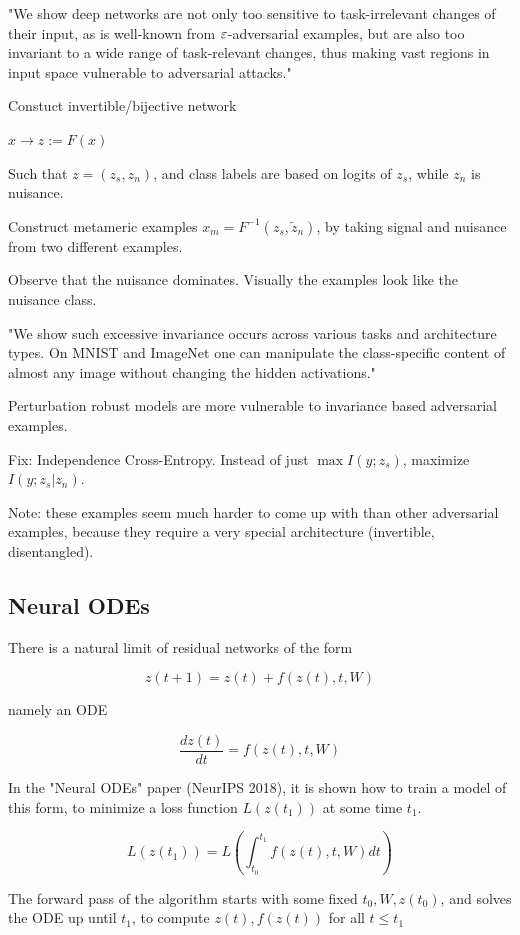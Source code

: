 \documentclass[english]{article}
\begin{document}
"We show
deep networks are not only too sensitive to task-irrelevant changes of their input,
as is well-known from $\varepsilon$-adversarial examples, but are also too invariant to a wide
range of task-relevant changes, thus making vast regions in input space vulnerable
to adversarial attacks."


Constuct invertible/bijective network 

$x\to z:=F(x)$

Such that $z=(z_s,z_n)$, and class labels are based on logits of $z_s$, while $z_n$ is nuisance. 

Construct metameric examples $x_m = F^{-1}(z_s,\tilde z_n)$, by taking signal and nuisance from two different examples. 

Observe that the nuisance dominates. Visually the examples look like the nuisance class.

"We show such excessive invariance occurs across various
tasks and architecture types. On MNIST and ImageNet one can manipulate the
class-specific content of almost any image without changing the hidden activations."

Perturbation robust models are more vulnerable to invariance based adversarial examples.

Fix: Independence Cross-Entropy. Instead of just $\max I(y;z_s)$, maximize $I(y;z_s|z_n)$.

Note: these examples seem much harder to come up with than other adversarial examples, because they require a very special architecture (invertible, disentangled). 

\eitem 


\subsection{Neural ODEs}
%
\bitem
\item There is a natural limit of residual networks of the form 

$$z(t+1) = z(t) + f(z(t),t,W)$$

namely an ODE

$$\frac{dz(t)}{dt} = f(z(t),t,W)$$

\item In the "Neural ODEs" paper (NeurIPS 2018), it is shown how to train a model of this form, to minimize a loss function $L(z(t_1))$ at some time $t_1$.

$$L(z(t_1)) = L(\int_{t_0}^{t_1} f(z(t),t,W)dt)$$

\item The forward pass of the algorithm starts with some fixed $t_0,W,z(t_0)$, and solves the ODE up until $t_1$, to compute $z(t), f(z(t))$ for all $t\le t_1$
\end{document}
